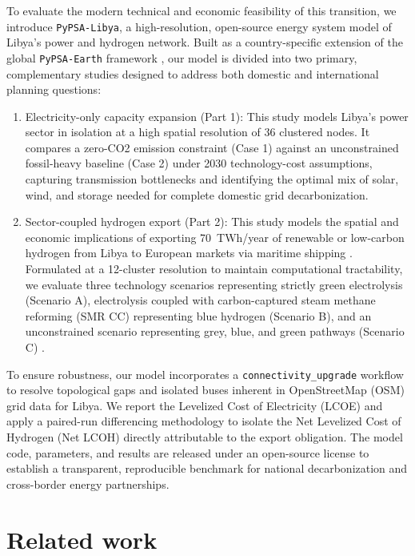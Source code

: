 \documentclass[preprint,12pt]{elsarticle}
\begin{document}
To evaluate the modern technical and economic feasibility of this transition, we introduce \texttt{PyPSA-Libya}, a high-resolution, open-source energy system model of Libya's power and hydrogen network. Built as a country-specific extension of the global \texttt{PyPSA-Earth} framework \cite{abdelkhalek2025pypsa}, our model is divided into two primary, complementary studies designed to address both domestic and international planning questions:
\begin{enumerate}
    \item {Electricity-only capacity expansion (Part 1):} This study models Libya's power sector in isolation at a high spatial resolution of 36 clustered nodes. It compares a zero-CO2 emission constraint (Case 1) against an unconstrained fossil-heavy baseline (Case 2) under 2030 technology-cost assumptions, capturing transmission bottlenecks and identifying the optimal mix of solar, wind, and storage needed for complete domestic grid decarbonization.
    \item {Sector-coupled hydrogen export (Part 2):} This study models the spatial and economic implications of exporting 70~TWh/year of renewable or low-carbon hydrogen from Libya to European markets via maritime shipping \cite{abdelkhalek2025pypsa}. Formulated at a 12-cluster resolution to maintain computational tractability, we evaluate three technology scenarios representing strictly green electrolysis (Scenario A), electrolysis coupled with carbon-captured steam methane reforming (SMR CC) representing blue hydrogen (Scenario B), and an unconstrained scenario representing grey, blue, and green pathways (Scenario C) .
\end{enumerate}

To ensure robustness, our model incorporates a \texttt{connectivity\_upgrade} workflow to resolve topological gaps and isolated buses inherent in OpenStreetMap (OSM) grid data for Libya. We report the Levelized Cost of Electricity (LCOE) and apply a paired-run differencing methodology to isolate the Net Levelized Cost of Hydrogen (Net LCOH) directly attributable to the export obligation. The model code, parameters, and results are released under an open-source license to establish a transparent, reproducible benchmark for national decarbonization and cross-border energy partnerships.


\section{Related work}
\label{sec:related_work}
\end{document}
